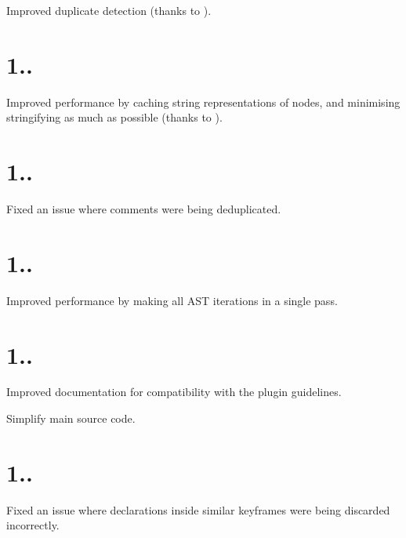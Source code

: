 \begin{DoxyItemize}
\item Improved duplicate detection (thanks to ).
\end{DoxyItemize}

\section*{1..}


\begin{DoxyItemize}
\item Improved performance by caching string representations of nodes, and minimising stringifying as much as possible (thanks to ).
\end{DoxyItemize}

\section*{1..}


\begin{DoxyItemize}
\item Fixed an issue where comments were being deduplicated.
\end{DoxyItemize}

\section*{1..}


\begin{DoxyItemize}
\item Improved performance by making all A\+ST iterations in a single pass.
\end{DoxyItemize}

\section*{1..}


\begin{DoxyItemize}
\item Improved documentation for compatibility with the plugin guidelines.
\item Simplify main source code.
\end{DoxyItemize}

\section*{1..}


\begin{DoxyItemize}
\item Fixed an issue where declarations inside similar keyframes were being discarded incorrectly.
\end{DoxyItemize}


